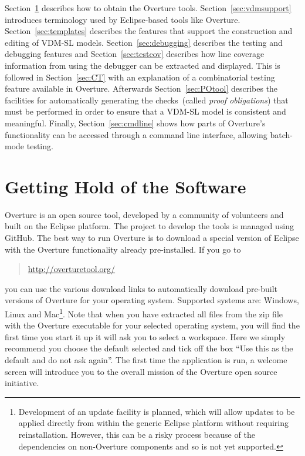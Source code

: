 Section~\ref{sec:install} describes how to obtain the Overture tools.  Section~\ref{sec:vdmsupport} introduces terminology used by Eclipse-based tools like Overture. Section~\ref{sec:templates} describes the features that support the construction and editing of
VDM-SL models.  Section~\ref{sec:debugging} describes the testing and debugging features and Section~\ref{sec:testcov} describes how line coverage information from using the debugger can be extracted and displayed. This is followed in Section~\ref{sec:CT} with an explanation of a combinatorial testing feature available in Overture.  Afterwards Section~\ref{sec:POtool} describes the facilities for automatically generating the checks~(called \emph{proof obligations}) that must be performed in order to ensure that a VDM-SL model is consistent and
meaningful.  Finally, Section~\ref{sec:cmdline} shows how parts of Overture's functionality can be accessed through a command line interface, allowing batch-mode testing. 
%
\section{Getting Hold of the Software}\label{sec:install}
Overture is an open source tool, developed by a community of volunteers and built on the Eclipse platform.  The project to develop the tools is managed using GitHub.  The best way to run Overture is to download a special version of Eclipse with the Overture functionality already pre-installed. If you go to
%
\begin{quote}
\url{http://overturetool.org/}
\end{quote}
%
\noindent you can use the various download links to automatically download pre-built versions of Overture for your operating system.  Supported systems are: Windows, Linux and Mac\footnote{Development of an update facility is planned, which will allow updates to be applied directly from within the generic Eclipse platform without requiring reinstallation. However, this can be a risky process because of the dependencies on non-Overture components and so is not yet supported.}.  Note that when you have extracted all files from the zip file with the Overture executable for your selected operating system, you will find the first time you start it up it will ask you to select a workspace. Here we simply recommend you choose the default selected and tick off the box ``Use this as the default and do not ask again''. The first time the application is run, a welcome screen will introduce you to the overall mission of the Overture open source
initiative. 

